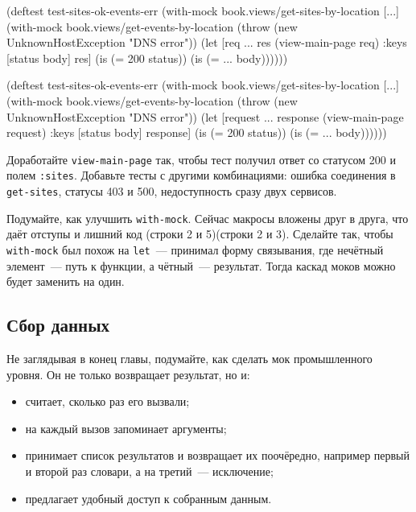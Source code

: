\ifnarrow

\begin{english}
  \begin{clojure/lines}
(deftest test-sites-ok-events-err
  (with-mock
    book.views/get-sites-by-location
    [...]
    (with-mock
     book.views/get-events-by-location
     (throw
      (new UnknownHostException
        "DNS error"))
     (let [req {...}
           res (view-main-page req)
           {:keys [status body]} res]
       (is (= 200 status))
       (is (= {...} body))))))
  \end{clojure/lines}
\end{english}

\else

\begin{english}
  \begin{clojure/lines}
(deftest test-sites-ok-events-err
  (with-mock book.views/get-sites-by-location [...]
    (with-mock book.views/get-events-by-location
      (throw (new UnknownHostException "DNS error"))
      (let [request {...}
            response (view-main-page request)
            {:keys [status body]} response]
        (is (= 200 status))
        (is (= {...} body))))))
  \end{clojure/lines}
\end{english}

\fi

Доработайте \verb|view-main-page| так, чтобы тест получил ответ со статусом
200 и полем \verb|:sites|. Добавьте тесты с другими комбинациями: ошибка
соединения в \verb|get-sites|, статусы 403 и 500, недоступность сразу двух
сервисов.

Подумайте, как улучшить \verb|with-mock|. Сейчас макросы вложены друг в друга,
что даёт отступы и лишний код \ifnarrow(строки 2 и 5)\else(строки 2 и 3)\fi. Сделайте так, чтобы
\verb|with-mock| был похож на \verb|let|~--- принимал форму связывания, где
нечётный элемент~--- путь к функции, а чётный~--- результат. Тогда каскад моков
можно будет заменить на один.

\subsection{Сбор данных}


Не заглядывая в конец главы, подумайте, как сделать мок промышленного уровня. Он
не только возвращает результат, но и:

\begin{itemize}

\item
  считает, сколько раз его вызвали;

\item
  на каждый вызов запоминает аргументы;

\item
  принимает список результатов и возвращает их поочёредно, например первый и
  второй раз словари, а на третий~--- исключение;

\item
  предлагает удобный доступ к собранным данным.

\end{itemize}

